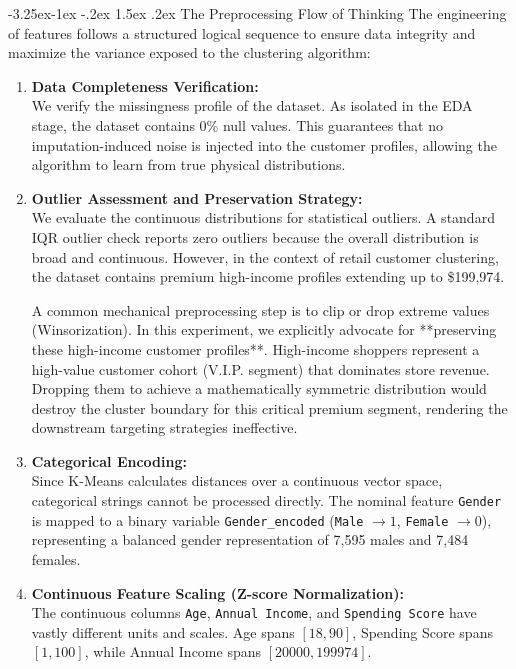 \documentclass[12pt,a4paper]{article}
\makeatletter
\renewcommand\paragraph{\@startsection{paragraph}{4}{\z@}%
  {-3.25ex\@plus -1ex \@minus -.2ex}%
  {1.5ex \@plus .2ex}%
  {\normalfont\normalsize\bfseries}}
\makeatother
\begin{document}
\paragraph{The Preprocessing Flow of Thinking}
The engineering of features follows a structured logical sequence to ensure data integrity and maximize the variance exposed to the clustering algorithm:
\begin{enumerate}
    \item \textbf{Data Completeness Verification:}\mbox{}\\ We verify the missingness profile of the dataset. As isolated in the EDA stage, the dataset contains 0\% null values. This guarantees that no imputation-induced noise is injected into the customer profiles, allowing the algorithm to learn from true physical distributions.
    \item \textbf{Outlier Assessment and Preservation Strategy:}\mbox{}\\ We evaluate the continuous distributions for statistical outliers. A standard IQR outlier check reports zero outliers because the overall distribution is broad and continuous. However, in the context of retail customer clustering, the dataset contains premium high-income profiles extending up to \$199,974. 
    
    A common mechanical preprocessing step is to clip or drop extreme values (Winsorization). In this experiment, we explicitly advocate for **preserving these high-income customer profiles**. High-income shoppers represent a high-value customer cohort (V.I.P. segment) that dominates store revenue. Dropping them to achieve a mathematically symmetric distribution would destroy the cluster boundary for this critical premium segment, rendering the downstream targeting strategies ineffective.
    \item \textbf{Categorical Encoding:}\mbox{}\\ Since K-Means calculates distances over a continuous vector space, categorical strings cannot be processed directly. The nominal feature \texttt{Gender} is mapped to a binary variable \texttt{Gender\_encoded} (\texttt{Male} $\rightarrow 1$, \texttt{Female} $\rightarrow 0$), representing a balanced gender representation of 7,595 males and 7,484 females.
    \item \textbf{Continuous Feature Scaling (Z-score Normalization):}\mbox{}\\ The continuous columns \texttt{Age}, \texttt{Annual Income}, and \texttt{Spending Score} have vastly different units and scales. Age spans $[18, 90]$, Spending Score spans $[1, 100]$, while Annual Income spans $[20000, 199974]$. 
    

\end{enumerate}
\end{document}
